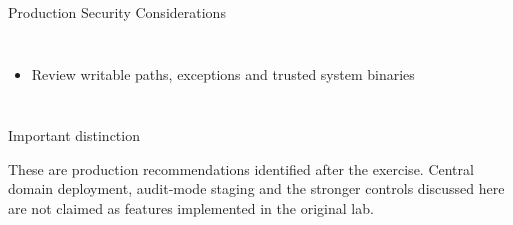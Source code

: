 \documentclass[aspectratio=169,10pt]{beamer}
\newcommand{\boxtext}[4][SoftGrey]{%
	\begingroup
	\setlength{\fboxsep}{7pt}%
	\colorbox{#1}{%
		\parbox{\dimexpr\linewidth-2\fboxsep\relax}{%
\RaggedRight
			{\color{#2}\large #3}
			\par
			\vspace{0.07cm}
			{\small #4}%
		}%
	}%
	\endgroup
}
\begin{document}
\begin{frame}{Production Security Considerations}
\begin{columns}[T,onlytextwidth]
\begin{itemize}
				\item Review writable paths, exceptions and trusted
				system binaries
				
			\end{itemize}
			
		\end{columns}
		
		\vspace{0.18cm}
		
		\boxtext[SoftOrange]
		{PortfolioOrange}
		{Important distinction}
		{
			These are production recommendations identified after
			the exercise. Central domain deployment, audit-mode staging
			and the stronger controls discussed here are not claimed
			as features implemented in the original lab.
		}
		
	\end{frame}
	
\end{document}

